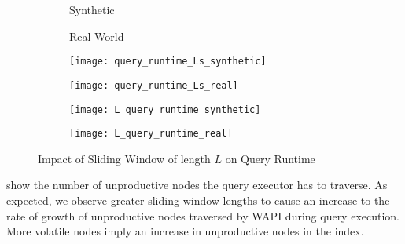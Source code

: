 \documentclass[abstracton,12pt]{scrartcl}
\theoremstyle{definition}
\begin{document}
\begin{figure}[h]
  \centering
  \begin{subfigure}{0.49\linewidth}
    \centering
    Synthetic
  \end{subfigure}
  \begin{subfigure}{0.49\linewidth}
    \centering
    Real-World
  \end{subfigure}
  \begin{subfigure}{0.49\linewidth}
    \centering
    \texttt{[image: query\_runtime\_Ls\_synthetic]}
    \caption{}
    \label{fig:query_runtime_Ls_synthetic}
  \end{subfigure}
  \begin{subfigure}{0.49\linewidth}
    \centering
    \texttt{[image: query\_runtime\_Ls\_real]}
    \caption{}
    \label{fig:query_runtime_Ls_real}
  \end{subfigure}
  \begin{subfigure}{0.49\linewidth}
    \centering
    \texttt{[image: L\_query\_runtime\_synthetic]}
    \caption{}
    \label{fig:L_query_runtime_synthetic}
  \end{subfigure}
  \begin{subfigure}{0.49\linewidth}
    \centering
    \texttt{[image: L\_query\_runtime\_real]}
    \caption{}
    \label{fig:L_query_runtime_real}
  \end{subfigure}
  \caption{Impact of Sliding Window of length $L$ on Query Runtime}
\end{figure}


 show the
number of unproductive nodes the query executor has to traverse. As
expected, we observe greater sliding window lengths to cause an increase to the
rate of growth of unproductive nodes traversed by WAPI during query execution.
More volatile nodes imply an increase in unproductive nodes in the index.
\end{document}
